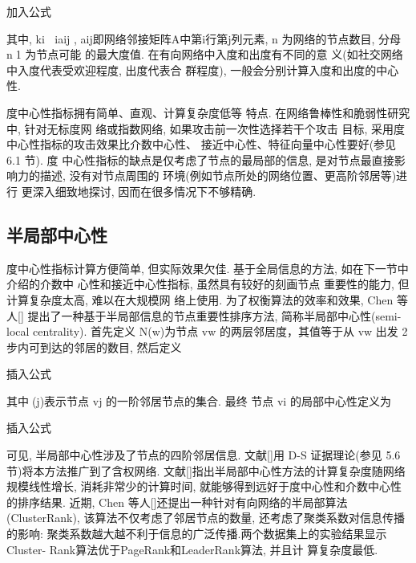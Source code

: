 			加入公式

			其中, ki iaij , aij即网络邻接矩阵A中第i行第j列元素, n 为网络的节点数目, 分母 n1 为节点可能 的最大度值. 在有向网络中入度和出度有不同的意 义(如社交网络中入度代表受欢迎程度, 出度代表合 群程度), 一般会分别计算入度和出度的中心性.

			度中心性指标拥有简单、直观、计算复杂度低等 特点. 在网络鲁棒性和脆弱性研究中, 针对无标度网 络或指数网络, 如果攻击前一次性选择若干个攻击 目标, 采用度中心性指标的攻击效果比介数中心性、 接近中心性、特征向量中心性要好(参见 6.1 节). 度 中心性指标的缺点是仅考虑了节点的最局部的信息, 是对节点最直接影响力的描述, 没有对节点周围的 环境(例如节点所处的网络位置、更高阶邻居等)进行 更深入细致地探讨, 因而在很多情况下不够精确.
\subsection{半局部中心性}
度中心性指标计算方便简单, 但实际效果欠佳. 基于全局信息的方法, 如在下一节中介绍的介数中 心性和接近中心性指标, 虽然具有较好的刻画节点 重要性的能力, 但计算复杂度太高, 难以在大规模网 络上使用. 为了权衡算法的效率和效果, Chen 等人[] 提出了一种基于半局部信息的节点重要性排序方法, 简称半局部中心性(semi-local centrality). 首先定义 N(w)为节点 vw 的两层邻居度，其值等于从 vw 出发 2 步内可到达的邻居的数目, 然后定义

			插入公式

			其中(j)表示节点 vj 的一阶邻居节点的集合. 最终 节点 vi 的局部中心性定义为

			插入公式

			可见, 半局部中心性涉及了节点的四阶邻居信息. 文献[]用 D-S 证据理论(参见 5.6 节)将本方法推广到了含权网络. 文献[]指出半局部中心性方法的计算复杂度随网络规模线性增长, 消耗非常少的计算时间, 就能够得到远好于度中心性和介数中心性的排序结果. 近期, Chen 等人[]还提出一种针对有向网络的半局部算法(ClusterRank), 该算法不仅考虑了邻居节点的数量, 还考虑了聚类系数对信息传播的影响: 聚类系数越大越不利于信息的广泛传播.两个数据集上的实验结果显示 Cluster- Rank算法优于PageRank和LeaderRank算法, 并且计 算复杂度最低.
